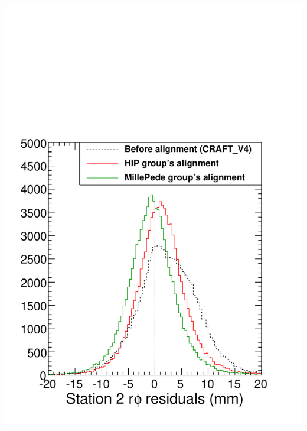 \documentclass[compress]{beamer}
\begin{document}
\begin{frame}
\begin{columns}
\includegraphics[width=\linewidth]{raw_station2.pdf}


\end{columns}
\end{frame}
\end{document}
